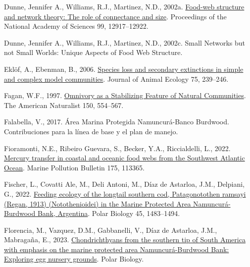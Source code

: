 \documentclass[preprint, 3p,
authoryear]{elsarticle} %
\newlength{\cslhangindent}
\newlength{\cslentryspacingunit} %
\newenvironment{CSLReferences}[2] %
 {%
  \setlength{\parindent}{0pt}
  \ifodd #1
  \let\oldpar\par
  \def\par{\hangindent=\cslhangindent\oldpar}
  \fi
  \setlength{\parskip}{#2\cslentryspacingunit}
 }%
 {}
\begin{document}
\begin{CSLReferences}{1}{0}
\leavevmode{}%
Dunne, Jennifer A., Williams, R.J., Martinez, N.D., 2002a.
\href{https://doi.org/10.1073/pnas.192407699}{Food-web structure and
network theory: {The} role of connectance and size}. Proceedings of the
National Academy of Sciences 99, 12917--12922.

\leavevmode{}%
Dunne, Jennifer A., Williams, R.J., Martinez, N.D., 2002c. Small
{Networks} but not {Small Worlds}: {Unique Aspects} of {Food Web
Structure}.

\leavevmode{}%
Eklöf, A., Ebenman, B., 2006.
\href{https://doi.org/10.1111/j.1365-2656.2006.01041.x}{Species loss and
secondary extinctions in simple and complex model communities}. Journal
of Animal Ecology 75, 239--246.

\leavevmode{}%
Fagan, W.F., 1997. \href{https://doi.org/10.1086/286081}{Omnivory as a
{Stabilizing Feature} of {Natural Communities}}. The American Naturalist
150, 554--567.

\leavevmode{}%
Falabella, V., 2017. Área {Marina Protegida Namuncurá-Banco Burdwood}.
{Contribuciones} para la línea de base y el plan de manejo.

\leavevmode{}%
Fioramonti, N.E., Ribeiro Guevara, S., Becker, Y.A., Riccialdelli, L.,
2022. \href{https://doi.org/10.1016/j.marpolbul.2022.113365}{Mercury
transfer in coastal and oceanic food webs from the {Southwest Atlantic
Ocean}}. Marine Pollution Bulletin 175, 113365.

\leavevmode{}%
Fischer, L., Covatti Ale, M., Deli Antoni, M., Díaz de Astarloa, J.M.,
Delpiani, G., 2022.
\href{https://doi.org/10.1007/s00300-022-03082-9}{Feeding ecology of the
longtail southern cod, {Patagonotothen} ramsayi ({Regan}, 1913)
({Notothenioidei}) in the {Marine Protected Area Namuncurá-Burdwood
Bank}, {Argentina}}. Polar Biology 45, 1483--1494.

\leavevmode{}%
Florencia, M., Vazquez, D.M., Gabbanelli, V., Díaz de Astarloa, J.M.,
Mabragaña, E., 2023.
\href{https://doi.org/10.1007/s00300-023-03128-6}{Chondrichthyans from
the southern tip of {South America} with emphasis on the marine
protected area {Namuncurá-Burdwood Bank}: Exploring egg nursery
grounds}. Polar Biology.


\end{CSLReferences}
\end{document}
